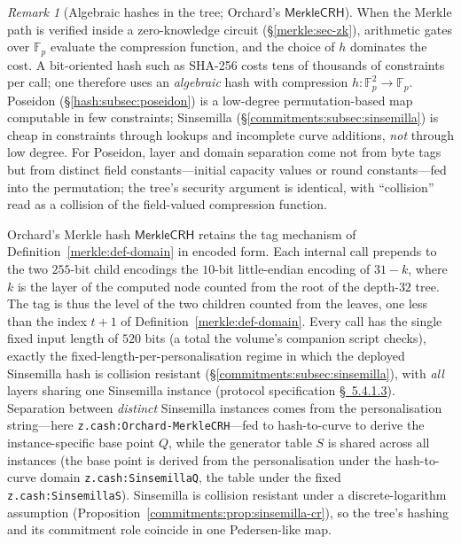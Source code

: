 \documentclass[11pt,a4paper]{article}
\theoremstyle{definition}
\theoremstyle{remark}
\newtheorem{remark}[theorem]{Remark}
\newcommand{\F}{\ensuremath{\mathbb{F}}}
\newcommand{\Fp}{\ensuremath{\mathbb{F}_{p}}}
\begin{document}
\begin{remark}[Algebraic hashes in the tree; Orchard's
\(\mathsf{MerkleCRH}\)]\label{merkle:rem-poseidon}
When the Merkle path is verified inside a zero-knowledge circuit
(\S\ref{merkle:sec-zk}), arithmetic gates over \(\Fp\) evaluate the
compression function, and the choice of \(h\) dominates the cost. A
bit-oriented hash such as SHA-256 costs tens of thousands of
constraints per call; one therefore uses an \emph{algebraic} hash
with compression \(h \colon \F_p^2 \to \F_p\). Poseidon
(\S\ref{hash:subsec:poseidon}) is a low-degree permutation-based map
computable in few constraints; Sinsemilla
(\S\ref{commitments:subsec:sinsemilla}) is cheap in constraints
through lookups and incomplete curve additions, \emph{not} through
low degree. For Poseidon, layer and domain separation come not from
byte tags but from distinct field constants---initial capacity
values or round constants---fed into the permutation; the tree's
security argument is identical, with ``collision'' read as a
collision of the field-valued compression function.

Orchard's Merkle hash \(\mathsf{MerkleCRH}\) retains the tag
mechanism of Definition~\ref{merkle:def-domain} in encoded form. Each
internal call prepends to the two \(255\)-bit child encodings the
\(10\)-bit little-endian encoding of \(31 - k\), where \(k\) is the
layer of the computed node counted from the root of the depth-\(32\)
tree. The tag is thus the level of the two children counted from the
leaves, one less than the index \(t + 1\) of
Definition~\ref{merkle:def-domain}. Every call has the single fixed
input length of \(520\) bits (a total the volume's companion script
checks), exactly the fixed-length-per-personalisation regime in
which the deployed Sinsemilla hash is collision resistant
(\S\ref{commitments:subsec:sinsemilla}), with \emph{all} layers
sharing one Sinsemilla instance
(protocol specification \href{https://zips.z.cash/protocol/protocol.pdf\#merklecrh}{\S~5.4.1.3}). Separation between
\emph{distinct} Sinsemilla instances comes from the personalisation
string---here \texttt{z.cash:\allowbreak Orchard-MerkleCRH}---fed to
hash-to-curve to derive the instance-specific base point \(Q\), while
the generator table \(S\) is shared across all instances
(the base point is derived from the personalisation under the
hash-to-curve domain \texttt{z.cash:\allowbreak SinsemillaQ}, the
table under the fixed \texttt{z.cash:\allowbreak SinsemillaS}).
Sinsemilla is collision resistant under a discrete-logarithm assumption
(Proposition~\ref{commitments:prop:sinsemilla-cr}), so the tree's
hashing and its commitment role coincide in one Pedersen-like map.
\end{remark}
\end{document}
